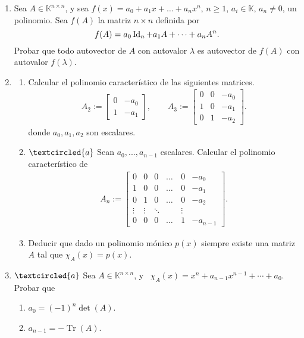 \begin{enumerate}[resume,topsep=6pt,itemsep=.4cm]


\item Sea $A\in\mathbb{K}^{n\times n}$, y sea $f(x) = a_0 + a_1 x + \dots + a_nx^n$, $n \geq 1$, $a_i\in\mathbb{K}$, $a_n \neq 0$, un polinomio. Sea $f(A)$ la matriz $n \times n$ definida por
$$f(A) = a_0 \operatorname{Id}_n + a_1 A + \dots + a_n A^n.$$
Probar que todo autovector de $A$ con autovalor $\lambda$ es autovector de $f(A)$ con autovalor $f(\lambda)$.


\item\label{caracteristico-otro} 

\begin{enumerate}
\item  Calcular el polinomio característico de las siguientes matrices.
\begin{align*}
A_2 := \begin{bmatrix} 0 & -a_0 \\ 1 & -a_1
\end{bmatrix},\quad\quad
A_3 := \begin{bmatrix} 0 & 0 & -a_0 \\ 1 & 0 & -a_1 \\ 0 & 1 & -a_2
\end{bmatrix}.
\end{align*}
donde $a_0, a_1, a_2$ son escalares.

\item\label{matriz de un polinomio} $\textcircled{a}$ Sean $a_0, ..., a_{n-1}$ escalares. Calcular el polinomio característico de
\begin{align*}
A_n := \begin{bmatrix} 0 & 0 & 0 &\dots & 0 & -a_0 \\ 1 & 0 & 0&  \dots & 0  & -a_1 \\ 0 & 1 & 0&  \dots & 0  & -a_2 \\ \vdots & \vdots & \ddots & \quad  & \vdots\\ 0 & 0 & 0 & \dots & 1  & -a_{n-1}
\end{bmatrix}.        
 \end{align*}

 \item Deducir que dado un polinomio mónico $p(x)$ siempre existe una matriz $A$ tal que $\chi_A(x)=p(x)$.
\end{enumerate}


\item\label{tr det}$\textcircled{a}$ 
Sea $A\in\mathbb{K}^{n\times n}$, y \ $\chi_A(x) = x^n+a_{n-1}x^{n-1}+\cdots+a_0$. Probar que
\begin{enumerate}
    \item\label{tr det a} $a_0 = (-1)^n \det(A)$.
    \item\label{tr det b} $a_{n-1} = - \operatorname{Tr}(A)$.
\end{enumerate}



\end{enumerate}
